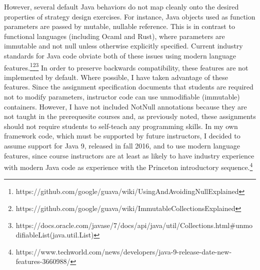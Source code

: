 \documentclass[pageno]{jpaper}
\begin{document}
However, several default Java behaviors do not map cleanly onto the desired properties of strategy design exercises.
For instance, Java objects used as function parameters are passed by mutable, nullable reference.
This is in contrast to functional languages (including Ocaml and Rust), where parameters are immutable and not null unless otherwise explicitly specified.
Current industry standards for Java code obviate both of these issues using modern language features.\footnote{https://github.com/google/guava/wiki/UsingAndAvoidingNullExplained}\footnote{https://github.com/google/guava/wiki/ImmutableCollectionsExplained}\footnote{https://docs.oracle.com/javase/7/docs/api/java/util/Collections.html\#unmodifiableList(java.util.List)}
In order to preserve backwards compatibility, these features are not implemented by default.
Where possible, I have taken advantage of these features.
Since the assignment specification documents that students are required not to modify parameters, instructor code can use unmodifiable (immutable) containers.
However, I have not included NotNull annotations because they are not taught in the prerequesite courses and, as previously noted, these assignments should not require students to self-teach any programming skills.
In my own framework code, which must be supported by future instructors, I decided to assume support for Java 9, released in fall 2016, and to use modern language features, since course instructors are at least as likely to have industry experience with modern Java code as experience with the Princeton introductory sequence.\footnote{https://www.techworld.com/news/developers/java-9-release-date-new-features-3660988/}
\end{document}
